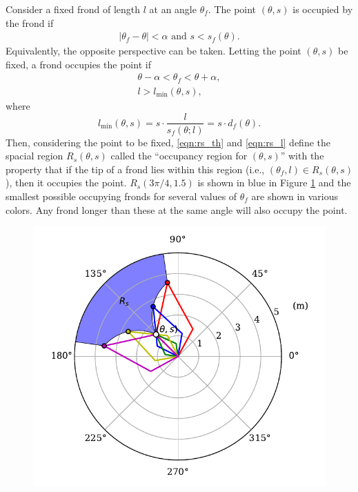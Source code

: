 \documentclass[ms,cpyr,lof,lot]{uathesis}
\providecommand{\DIFaddbeginFL}{} %
\providecommand{\DIFaddendFL}{} %
\providecommand{\DIFdelbeginFL}{} %
\providecommand{\DIFdelendFL}{} %
\newcommand{\DIFscaledelfig}{0.5}
\newlength{\DIFdelgraphicswidth} %
\newlength{\DIFdelgraphicsheight} %
\newcommand{\DIFaddincludegraphics}[2][]{{\color{blue}\fbox{\DIFOincludegraphics[#1]{#2}}}} %
\newcommand{\DIFdelincludegraphics}[2][]{%
\sbox{\DIFdelgraphicsbox}{\DIFOincludegraphics[#1]{#2}}%
\settoboxwidth{\DIFdelgraphicswidth}{\DIFdelgraphicsbox} %
\settoboxtotalheight{\DIFdelgraphicsheight}{\DIFdelgraphicsbox} %
\scalebox{\DIFscaledelfig}{%
\parbox[b]{\DIFdelgraphicswidth}{\usebox{\DIFdelgraphicsbox}\\[-\baselineskip] \rule{\DIFdelgraphicswidth}{0em}}\llap{\resizebox{\DIFdelgraphicswidth}{\DIFdelgraphicsheight}{%
\setlength{\unitlength}{\DIFdelgraphicswidth}%
\begin{picture}(1,1)%
\thicklines\linethickness{2pt} %
{\color[rgb]{1,0,0}\put(0,0){\framebox(1,1){}}}%
{\color[rgb]{1,0,0}\put(0,0){\line( 1,1){1}}}%
{\color[rgb]{1,0,0}\put(0,1){\line(1,-1){1}}}%
\end{picture}%
}\hspace*{3pt}}} %
} %
\DeclareRobustCommand{\DIFaddbeginFL}{\DIFOaddbeginFL \let\includegraphics\DIFaddincludegraphics} %
\DeclareRobustCommand{\DIFaddendFL}{\DIFOaddendFL \let\includegraphics\DIFOincludegraphics} %
\DeclareRobustCommand{\DIFdelbeginFL}{\DIFOdelbeginFL \let\includegraphics\DIFdelincludegraphics} %
\DeclareRobustCommand{\DIFdelendFL}{\DIFOaddendFL \let\includegraphics\DIFOincludegraphics} %
\begin{document}
Consider a fixed frond of length $l$ at an angle $\theta_f$. The point
$(\theta,s)$ is occupied by the frond if
\begin{align*}
	\left|\theta_f - \theta \right| < \alpha
  \mbox{ and }
	s < s_f(\theta).
\end{align*}
Equivalently, the opposite perspective can be taken.
Letting the point $(\theta,s)$ be fixed, a frond occupies the point if
\begin{align}
	\theta - \alpha < \theta_f < \theta + \alpha,
	\label{eqn:rs_th} \\
	l > l_{\min}(\theta,s),
	\label{eqn:rs_l}
\end{align}
where
\begin{equation}
	l_{\min}(\theta,s) = s \cdot \frac{l}{s_f(\theta;l)} = s \cdot d_f(\theta).
  \label{eqn:l_min}
\end{equation}
Then, considering the point to be fixed, \eqref{eqn:rs_th} and \eqref{eqn:rs_l} define the spacial region $R_s(\theta,s)$ called the ``occupancy region for $(\theta,s)$'' with the property that if the tip of a frond lies within this region (i.e., $(\theta_f,l) \in R_s(\theta,s)$), then it occupies the point.
$R_s(3\pi/4,1.5)$ is shown in blue in Figure \ref{fig:shade_area} and the smallest possible occupying fronds for several values of $\theta_f$ are shown in various colors.
Any frond longer than these at the same angle will also occupy the point.

\begin{figure}[h]
	\centering
	\includegraphics[width=4.5in]{shade_area}
	\DIFdelbeginFL %
\DIFdelendFL \DIFaddbeginFL {}
	\DIFaddendFL \label{fig:shade_area}
\end{figure}
\end{document}
